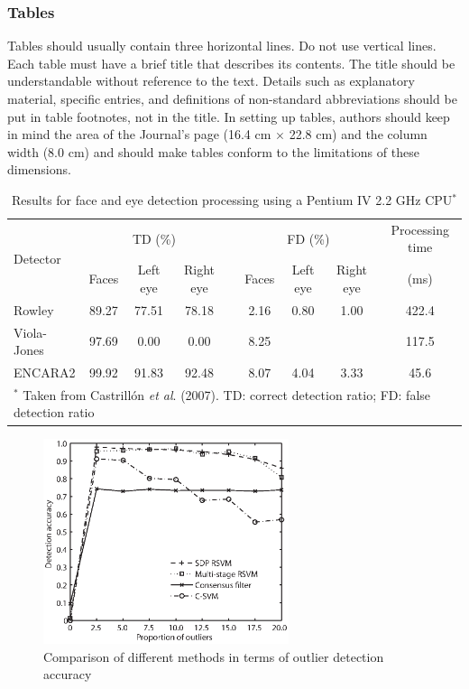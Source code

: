 \documentclass[twoside,twocolumn]{article}
\begin{document}
\subsubsection{Tables}\label{sec:table}

Tables should usually contain three horizontal lines. Do not use vertical lines. Each table must have a brief title that describes its contents. The title should be understandable without reference to the text. Details such as explanatory material, specific entries, and definitions of non-standard abbreviations should be put in table footnotes, not in the title. In setting up tables, authors should keep in mind the area of the Journal's page (16.4 cm $\times$ 22.8 cm) and the column width (8.0 cm) and should make tables conform to the limitations of these dimensions.

\begin{table}[thp]\footnotesize
\centering \caption{Results for face and eye detection processing
using a Pentium IV 2.2 GHz
CPU$^\textbf{*}$ \citep{Deniz10}}\label{Table:FacesDetected}
\begin{tabular*}{16cm}{@{\qquad}l@{\qquad}c@{\qquad}c@{\qquad}ccc@{\qquad}c@{\qquad}c@{\qquad}c}
\toprule[0.75pt]
\multirow{2}{*}{Detector} & \multicolumn{3}{c}{TD (\%)} &  & \multicolumn{3}{c}{FD (\%)} & \multicolumn{1}{c}{Processing time} \\
\cmidrule[0.5pt]{2-4}\cmidrule[0.5pt]{6-8}
& Faces & Left eye & Right eye &  & Faces & Left eye & Right eye & (ms) \\
\midrule[0.5pt]
Rowley  & 89.27 & 77.51   &  78.18  &  &  2.16 & 0.80 & 1.00 & 422.4 \\
Viola-Jones  & 97.69 & 0.00  &  0.00  &  & 8.25  &  &  & 117.5 \\
ENCARA2  &  99.92 & 91.83 &  92.48 &  &  8.07  &  4.04 & 3.33 &45.6\\
\bottomrule[0.75pt]
\multicolumn{9}{p{15.6cm}}{\scriptsize $^*$ Taken
from Castrill\'{o}n \emph{et al}. (2007). TD: correct detection
ratio; FD: false detection ratio}

\end{tabular*}
\end{table}


\begin{figure}[tbh]
  \centering
      \includegraphics[width=7.2cm]{pics/outlierdetection.eps}
  \caption{Comparison of different methods in terms of
  outlier detection accuracy \citep{Zhou11}}\label{fig:Prediction}
\end{figure}
\end{document}

